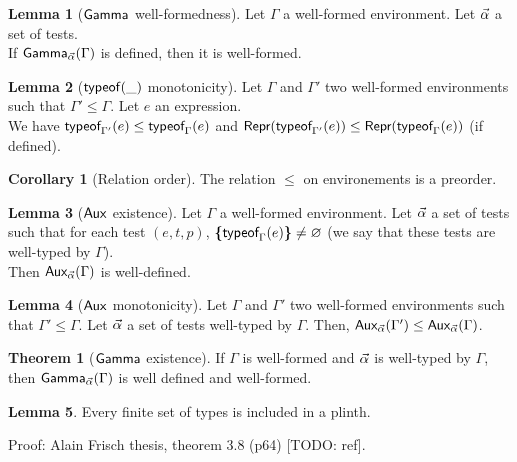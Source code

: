 \documentclass[a4paper]{article}
\theoremstyle{definition}
\newtheorem{theorem}{Theorem}
\newtheorem{lemma}{Lemma}
\newtheorem{corollary}{Corollary}
\begin{document}
        \begin{lemma}[$\textsf{Gamma}_{} $ well-formedness]
          Let $\Gamma$ a well-formed environment. Let $\vec \alpha$ a set of tests.\\
          If $\textsf{Gamma}_{\vec \alpha}(\Gamma)$ is defined, then it is well-formed.
        \end{lemma}

        \begin{lemma}[$\textsf{typeof}_{}(\_)$ monotonicity]
          Let $\Gamma$ and $\Gamma'$ two well-formed environments such that $\Gamma' \leq \Gamma$.
          Let $e$ an expression.\\
          We have $\textsf{typeof}_{\Gamma'}(e) \leq \textsf{typeof}_{\Gamma}(e)$ and
          $\textsf{Repr}(\textsf{typeof}_{\Gamma'}(e)) \leq \textsf{Repr}(\textsf{typeof}_{\Gamma}(e))$ (if defined).
        \end{lemma}

        \begin{corollary}[Relation order]
          The relation $\leq$ on environements is a preorder.
        \end{corollary}

        \begin{lemma}[$\textsf{Aux}_{} $ existence]
          Let $\Gamma$ a well-formed environment.
          Let $\vec \alpha$ a set of tests such that for each test $(e,t,p)$, $\textbf{\textup{\{}}\textsf{typeof}_{\Gamma}(e)\textbf{\textup{\}}} \neq \varnothing$
          (we say that these tests are well-typed by $\Gamma$).\\
          Then $\textsf{Aux}_{\vec \alpha}(\Gamma)$ is well-defined.
        \end{lemma}

        \begin{lemma}[$\textsf{Aux}_{}$ monotonicity]
          Let $\Gamma$ and $\Gamma'$ two well-formed environments such that $\Gamma' \leq \Gamma$.
          Let $\vec \alpha$ a set of tests well-typed by $\Gamma$. Then, $\textsf{Aux}_{\vec \alpha}(\Gamma') \leq \textsf{Aux}_{\vec \alpha}(\Gamma)$.
        \end{lemma}

        \begin{theorem}[$\textsf{Gamma}_{}$ existence]
            If $\Gamma$ is well-formed and $\vec \alpha$ is well-typed by $\Gamma$, then $\textsf{Gamma}_{\vec \alpha}(\Gamma)$ is well defined and well-formed.
        \end{theorem}

        \begin{lemma}
          Every finite set of types is included in a plinth.
        \end{lemma}
        Proof: Alain Frisch thesis, theorem 3.8 (p64) [TODO: ref].
\end{document}
